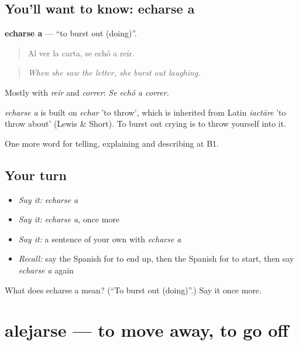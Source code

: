 \subsection*{You'll want to know: echarse a}
\textbf{echarse a} — \textquotedblleft{}to burst out (doing)\textquotedblright{}.

\begin{quote}
Al ver la carta, se echó a reír.
\end{quote}

\begin{quote}
\emph{When she saw the letter, she burst out laughing.}
\end{quote}

Mostly with \emph{reír} and \emph{correr}: \emph{Se echó a correr.}

\begin{cousinweb}
\emph{echarse a} is built on \emph{echar} 'to throw', which is inherited from Latin \emph{iactāre} 'to throw about' (Lewis \& Short). To burst out crying is to throw yourself into it.
\end{cousinweb}

\begin{grammarlens}[title={What you've built}]
One more word for telling, explaining and describing at B1.
\end{grammarlens}

\subsection*{Your turn}
\begin{itemize}
\raggedright
  \item \emph{Say it:} \emph{echarse a}
  \item \emph{Say it:} \emph{echarse a}, once more
  \item \emph{Say it:} a sentence of your own with \emph{echarse a}
  \item \emph{Recall:} say the Spanish for to end up, then the Spanish for to start, then say \emph{echarse a} again
\end{itemize}

\begin{tcolorbox}[breakable,colback=teal!4,colframe=teal!35!black,title={Before you move on}]
What does echarse a mean? (\textquotedblleft{}To burst out (doing)\textquotedblright{}.) Say it once more.
\end{tcolorbox}
\section[alejarse]{alejarse — to move away, to go off}

